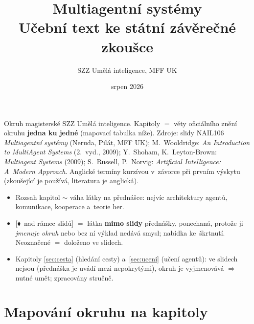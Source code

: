 \documentclass[11pt,a4paper]{article}
\title{\textbf{Multiagentní systémy}\\[0.3em]\large Učební text ke státní závěrečné zkoušce}
\author{SZZ Umělá inteligence, MFF UK}
\date{srpen 2026}
\theoremstyle{definition}
\newcommand{\mimo}{\textcolor{markcol}{\textsf{\footnotesize[$\blacklozenge$~nad rámec slidů]}}}
\begin{document}
\maketitle

\vspace{-1.5em}

\begin{center}
\begin{minipage}{0.93\textwidth}
\small
Okruh  magisterské SZZ Umělá inteligence. Kapitoly $=$ věty
oficiálního znění okruhu \textbf{jedna ku jedné} (mapovací tabulka níže). Zdroje: slidy
NAIL106 \emph{Multiagentní systémy} (Neruda, Pilát, MFF UK); M.~Wooldridge: \emph{An
Introduction to MultiAgent Systems} (2.~vyd., 2009); Y.~Shoham, K.~Leyton-Brown:
\emph{Multiagent Systems} (2009); S.~Russell, P.~Norvig: \emph{Artificial Intelligence:
A~Modern Approach}. Anglické termíny kurzívou v~závorce při prvním výskytu (zkoušející je
používá, literatura je anglická).
\end{minipage}
\end{center}

\begin{center}
\begin{minipage}{0.93\textwidth}
\begin{poznbox}
\small
\begin{itemize}
\item Rozsah kapitol $\sim$ váha látky na přednášce: nejvíc architektury agentů, komunikace,
  kooperace a~teorie her.
\item \mimo{} $=$ látka \textbf{mimo slidy} přednášky, ponechaná, protože ji \emph{jmenuje
  okruh} nebo bez ní výklad nedává smysl; nabídka ke~škrtnutí. Neoznačené $=$ doloženo ve
  slidech.
\item Kapitoly \ref{sec:cesta} (hledání cesty) a~\ref{sec:uceni} (učení agentů): ve slidech
  nejsou (přednáška je uvádí mezi nepokrytými), okruh je vyjmenovává $\Rightarrow$ nutné
  umět; zpracovány stručně.
\end{itemize}
\end{poznbox}
\end{minipage}
\end{center}

\section*{Mapování okruhu na kapitoly}
\end{document}
